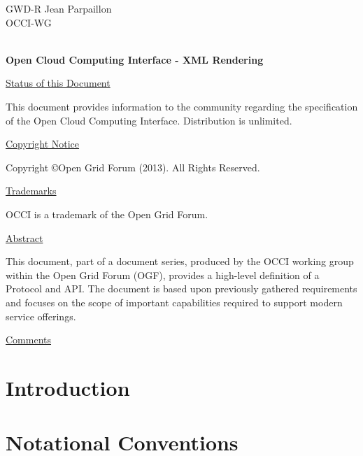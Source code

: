 \documentclass[10pt,a4paper]{article}
\begin{document}
\thispagestyle{empty}

GWD-R \hfill Jean Parpaillon\\
OCCI-WG \\
\\

\vspace*{0.5in}

\begin{Large}
\textbf{Open Cloud Computing Interface - XML Rendering}
\end{Large}

\vspace*{0.5in}

\underline{Status of this Document}

This document provides information to the community regarding the
specification of the Open Cloud Computing Interface. Distribution is
unlimited.

\underline{Copyright Notice}

Copyright \copyright Open Grid Forum (2013). All Rights Reserved.

\underline{Trademarks}

OCCI is a trademark of the Open Grid Forum.

\underline{Abstract}

This document, part of a document series, produced by the OCCI working
group within the Open Grid Forum (OGF), provides a high-level
definition of a Protocol and API. The document is based upon
previously gathered requirements and focuses on the scope of important
capabilities required to support modern service offerings.

\underline{Comments}
\newcommand{\ralf}[1]{\textcolor{red}{RN: #1}}
\newcommand{\andy}[1]{\textcolor{green}{AE: #1}}
\newcommand{\florian}[1]{\textcolor{blue}{FF: #1}}
\newcommand{\jean}[1]{\textcolor{purple}{JP: #1}}

\newpage
\tableofcontents
\newpage

\section{Introduction}


\section{Notational Conventions}

\end{document}

